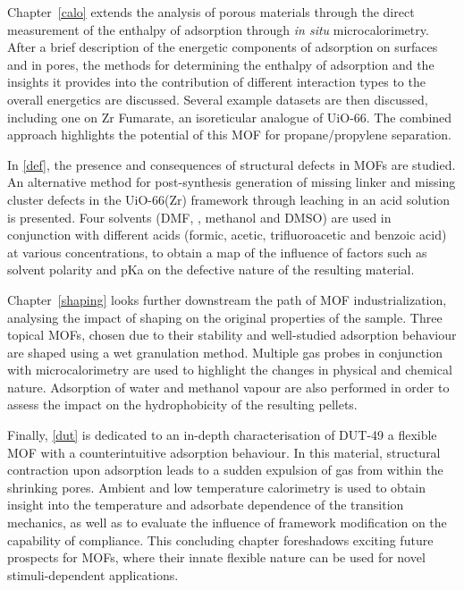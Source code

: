Chapter~\ref{calo} extends the analysis of porous materials through
the direct measurement of the enthalpy of adsorption through 
\textit{in situ} microcalorimetry. After a brief description 
of the energetic components of adsorption on surfaces
and in pores, the methods for determining the enthalpy of 
adsorption and the insights it provides into the contribution
of different interaction types to the overall energetics are 
discussed. Several example datasets are then discussed, including 
one on Zr Fumarate, an isoreticular analogue of UiO-66. The combined
approach highlights the potential of this \gls{MOF} for propane/propylene
separation.

In \autoref{def}, the presence and consequences of structural defects
in \glspl{MOF} are studied. An alternative method for 
post-synthesis generation of missing linker and missing cluster 
defects in the 
UiO-66(Zr) framework through leaching in an acid solution is presented.
Four solvents (\gls{DMF}, , methanol and \gls{DMSO}) are used in 
conjunction with different acids (formic, acetic, trifluoroacetic and
benzoic acid) at various concentrations, to obtain a map of 
the influence of factors such as solvent polarity and \gls{pKa}
on the defective nature of the resulting material.

Chapter~\ref{shaping} looks further downstream the path of 
\gls{MOF} industrialization, analysing the impact of shaping on the
original properties of the sample. Three topical \glspl{MOF}, chosen
due to their stability and well-studied adsorption behaviour
are shaped using a wet granulation method. Multiple gas probes 
in conjunction with microcalorimetry are used to highlight the 
changes in physical and chemical nature. Adsorption of water and 
methanol vapour are also performed in order to assess the impact on 
the hydrophobicity of the resulting pellets.

Finally, \autoref{dut} is dedicated to an in-depth characterisation
of DUT-49 a flexible \gls{MOF} with a counterintuitive adsorption behaviour.
In this material, structural contraction upon adsorption leads 
to a sudden expulsion of gas from within the shrinking pores.
Ambient and low temperature calorimetry is used to obtain 
insight into the temperature and adsorbate dependence of 
the transition mechanics, as well as to evaluate
the influence of framework modification on the capability of 
compliance. This concluding chapter foreshadows exciting future
prospects for \glspl{MOF}, where their innate flexible nature
can be used for novel stimuli-dependent applications.

